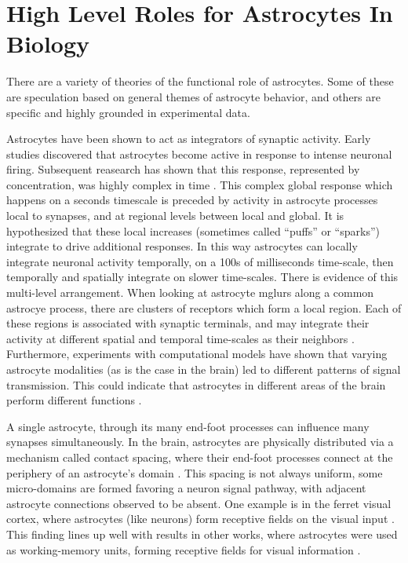
    \section{High Level Roles for Astrocytes In Biology}

    There are a variety of theories of the functional role of astrocytes.
    Some of these are speculation based on general themes of astrocyte behavior,
    and others are specific and highly grounded in experimental data.

    Astrocytes have been shown to act as integrators of synaptic activity. Early
    studies discovered that astrocytes become active in response to intense
    neuronal firing. Subsequent reasearch has shown that this response, represented
    by \ca concentration, was highly complex in time
    \parencite{araque_2014}. This complex global response which happens on a
    seconds timescale is preceded by \ca activity in astrocyte processes local
    to synapses, and at regional levels between local and global. It is
    hypothesized that these local \ca increases (sometimes called ``puffs'' or
    ``sparks'') integrate to drive additional responses. In this way astrocytes
    can locally integrate neuronal activity temporally, on a 100s of
    milliseconds time-scale, then temporally and spatially integrate on slower
    time-scales. There is evidence of this multi-level arrangement. When looking
    at astrocyte \glspl{mglur} along a common astrocye process, there are
    clusters of receptors which form a local region. Each of these regions is
    associated with synaptic terminals, and may integrate their activity at
    different spatial and temporal time-scales as their neighbors
    \parencite{pitta_2012}. Furthermore, experiments with computational models
    have shown that varying astrocyte modalities (as is the case in the brain) led
    to different patterns of signal transmission. This could indicate that
    astrocytes in different areas of the brain perform different functions
    \parencite{pitta_2012}.

    A single astrocyte, through its many end-foot processes can influence many
    synapses simultaneously. In the brain, astrocytes are physically distributed
    via a mechanism called contact spacing, where their end-foot processes
    connect at the periphery of an astrocyte's domain
    \parencite{pitta_2012}. This spacing is not always uniform, some
    micro-domains are formed favoring a neuron signal pathway, with adjacent
    astrocyte connections observed to be absent. One example is in the ferret
    visual cortex, where astrocytes (like neurons) form receptive fields on the
    visual input \parencite{pitta_2012}. This finding lines up well with results
    in other works, where astrocytes were used as working-memory units, forming
    receptive fields for visual information \parencite{gordleeva_2021}.

